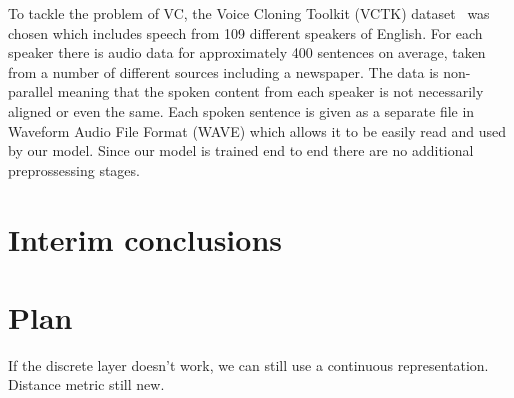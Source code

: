 \documentclass{article}
\begin{document}
To tackle the problem of VC, the Voice Cloning Toolkit (VCTK) dataset~\cite{yamagishi_english_2012} was chosen which includes speech from 109 different speakers of English. For each speaker there is audio data for approximately 400 sentences on average, taken from a number of different sources including a newspaper. The data is non-parallel meaning that the spoken content from each speaker is not necessarily aligned or even the same. Each spoken sentence is given as a separate file in Waveform Audio File Format (WAVE) which allows it to be easily read and used by our model. Since our model is trained end to end there are no additional preprossessing stages.

\section{Interim conclusions}
\label{sec:concl}

\section{Plan}
\label{sec:plan}

If the discrete layer doesn't work, we can still use a continuous representation. Distance metric still new.


\end{document}
